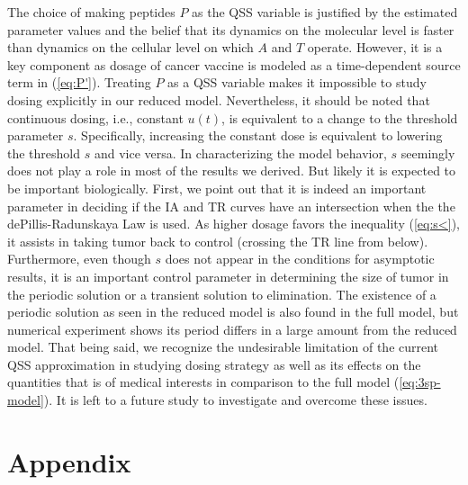 \documentclass[review,authoryear]{elsarticle}
\begin{document}
The choice of making peptides $P$ as the QSS variable is justified
by the estimated parameter values and the belief that its dynamics on the molecular
level is faster than dynamics on the cellular level on which $A$
and $T$ operate. However, it is a key component as dosage of cancer
vaccine is modeled as a time-dependent source term in (\ref{eq:P'}).
Treating $P$ as a QSS variable makes it impossible to study dosing
explicitly in our reduced model. Nevertheless, it should be noted
that continuous dosing, i.e., constant $u(t)$, is equivalent to a
change to the threshold parameter $s$. Specifically, increasing the
constant dose is equivalent to lowering the threshold $s$ and vice versa. In characterizing the model behavior, $s$ seemingly does not
play a role in most of the results we derived. But likely it is expected
to be important biologically. First, we point out that it is indeed
an important parameter in deciding if the IA and TR curves have an
intersection when the the dePillis-Radunskaya Law is used. As higher
dosage favors the inequality (\ref{eq:s<}), it assists in taking
tumor back to control (crossing the TR line from below). Furthermore,
even though $s$ does not appear in the conditions for asymptotic
results, it is an important control parameter in determining the size
of tumor in the periodic solution or a transient solution to elimination.
The existence of a periodic solution as seen in the reduced model
is also found in the full model, but numerical experiment shows its
period differs in a large amount from the reduced model. That being
said, we recognize the undesirable limitation of the current QSS
approximation in studying dosing strategy as well as its effects on
the quantities that is of medical interests in comparison to the full
model (\ref{eq:3sp-model}). It is left to a future study to investigate and
overcome these issues. 



\section*{Appendix}
\end{document}
